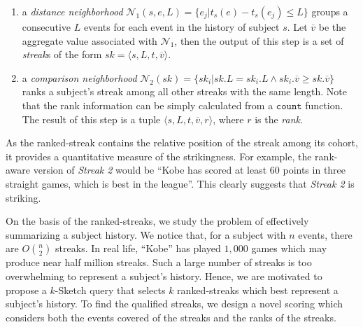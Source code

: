 \begin{enumerate}
\item {a \emph{distance neighborhood} $\mathcal{N}_1(s,e,L)=\{e_j | t_s(e) - t_s(e_j) \leq L \}$ groups a consecutive $L$ events for each event in the history of subject $s$. Let $\overline{v}$ be the aggregate value associated with $\mathcal{N}_1$, then the output of this step is a set of \emph{streak}s of the form  $sk=\langle s, L, t, \overline{v} \rangle$.}
\item {a \emph{comparison neighborhood} $\mathcal{N}_2(sk) = \{sk_i | sk.L = sk_i.L \wedge sk_i.\overline{v} \geq sk.\overline{v} \}$ ranks a subject's streak among all other streaks with the same length.  Note that the rank information can be simply calculated from a $\mathtt{count}$ function. The result of this step is a tuple $\langle s, L, t, \overline{v}, r \rangle$, where $r$ is the \emph{rank}.}
\end{enumerate}
%
%

As the ranked-streak contains the relative position of the streak among its cohort, it provides a quantitative measure of the strikingness.
For example, the rank-aware version of \emph{Streak 2} would be ``Kobe has scored at least 60 points in three straight games, which is best in the league''.  This clearly suggests that \emph{Streak 2} is striking.
%

On the basis of the ranked-streaks, we study the problem of effectively summarizing
a subject history. We notice that, for a subject with $n$ events, there
are $O{n \choose 2}$ streaks. 
In real life, ``Kobe'' has played $1,000$ games which may produce near half million streaks.
Such a large number of streaks is too overwhelming to represent a subject's history. Hence,
we are motivated to propose a $k$-Sketch query that selects $k$ ranked-streaks which best represent
a subject's history. To find the qualified streaks, we design a novel scoring which
considers both the events covered of the streaks and the ranks of the streaks.


